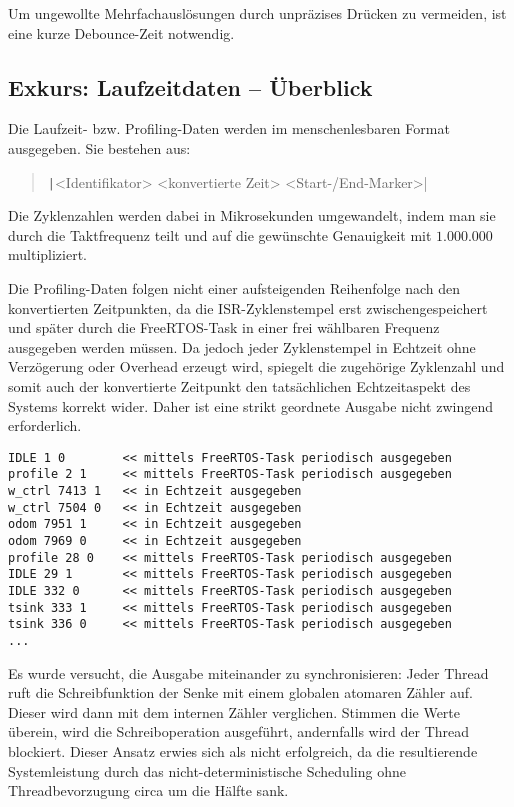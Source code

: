 Um ungewollte Mehrfachauslösungen durch unpräzises Drücken zu vermeiden, ist
eine kurze Debounce-Zeit notwendig.

\subsection{Exkurs: Laufzeitdaten -- Überblick}

Die Laufzeit- bzw. Profiling-Daten werden im menschenlesbaren Format ausgegeben.
Sie bestehen aus:

\begin{quote}
    \texttt|<Identifikator> <konvertierte Zeit> <Start-/End-Marker>|
\end{quote}

Die Zyklenzahlen werden dabei in Mikrosekunden umgewandelt, indem man sie durch
die Taktfrequenz teilt und auf die gewünschte Genauigkeit mit $1.000.000$
multipliziert.

Die Profiling-Daten folgen nicht einer aufsteigenden Reihenfolge nach den
konvertierten Zeitpunkten, da die ISR-Zyklenstempel erst zwischengespeichert und
später durch die FreeRTOS-Task in einer frei wählbaren Frequenz ausgegeben
werden müssen. Da jedoch jeder Zyklenstempel in Echtzeit ohne Verzögerung oder
Overhead erzeugt wird, spiegelt die zugehörige Zyklenzahl und somit auch der
konvertierte Zeitpunkt den tatsächlichen Echtzeitaspekt des Systems korrekt
wider. Daher ist eine strikt geordnete Ausgabe nicht zwingend erforderlich.

\begin{code}
\begin{verbatim}
IDLE 1 0        << mittels FreeRTOS-Task periodisch ausgegeben
profile 2 1     << mittels FreeRTOS-Task periodisch ausgegeben
w_ctrl 7413 1   << in Echtzeit ausgegeben
w_ctrl 7504 0   << in Echtzeit ausgegeben
odom 7951 1     << in Echtzeit ausgegeben
odom 7969 0     << in Echtzeit ausgegeben
profile 28 0    << mittels FreeRTOS-Task periodisch ausgegeben
IDLE 29 1       << mittels FreeRTOS-Task periodisch ausgegeben
IDLE 332 0      << mittels FreeRTOS-Task periodisch ausgegeben
tsink 333 1     << mittels FreeRTOS-Task periodisch ausgegeben
tsink 336 0     << mittels FreeRTOS-Task periodisch ausgegeben
...
\end{verbatim}
\end{code}

Es wurde versucht, die Ausgabe miteinander zu synchronisieren: Jeder Thread ruft
die Schreibfunktion der Senke mit einem globalen atomaren Zähler auf. Dieser
wird dann mit dem internen Zähler verglichen. Stimmen die Werte überein, wird
die Schreiboperation ausgeführt, andernfalls wird der Thread blockiert. Dieser
Ansatz erwies sich als nicht erfolgreich, da die resultierende Systemleistung
durch das nicht-deterministische Scheduling ohne Threadbevorzugung circa um die
Hälfte sank.

